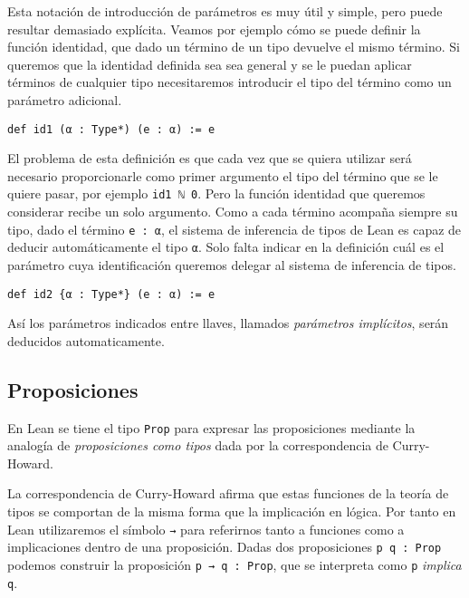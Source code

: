 Esta notación de introducción de parámetros es muy útil y simple, pero puede
resultar demasiado explícita. Veamos por ejemplo cómo se puede definir la
función identidad, que dado un término de un tipo devuelve el mismo término.
Si queremos que la identidad definida sea sea general y se le puedan aplicar términos
de cualquier tipo necesitaremos introducir el tipo del término como un parámetro
adicional.

\begin{lstlisting}
def id1 (α : Type*) (e : α) := e
\end{lstlisting}

El problema de esta definición es que cada vez que se quiera utilizar será
necesario proporcionarle como primer argumento el tipo del término que se le
quiere pasar, por ejemplo \lstinline{id1 ℕ 0}.
Pero la función identidad que queremos considerar recibe un solo argumento.
Como a cada término acompaña siempre su tipo, dado el término \lstinline{e : α},
el sistema de inferencia de tipos de Lean es capaz de deducir automáticamente el
tipo \lstinline{α}. Solo falta indicar en la definición cuál es el parámetro
cuya identificación queremos delegar al sistema de inferencia de tipos.

\begin{lstlisting}
def id2 {α : Type*} (e : α) := e
\end{lstlisting}

Así los parámetros indicados entre llaves, llamados \textit{parámetros
	implícitos}, serán deducidos automaticamente.


\subsection{Proposiciones}

En Lean se tiene el tipo \lstinline{Prop} para expresar las proposiciones
mediante la analogía de \textit{proposiciones como tipos} dada por la
correspondencia de Curry-Howard.

La correspondencia de Curry-Howard afirma que estas funciones de la
teoría de tipos se comportan de la misma forma que la implicación en lógica. Por
tanto en Lean utilizaremos el símbolo \lstinline{→} para referirnos tanto a
funciones como a implicaciones dentro de una proposición. Dadas dos
proposiciones \lstinline{p q : Prop} podemos construir la proposición
\lstinline{p → q : Prop}, que se interpreta como \lstinline{p} \textit{implica}
\lstinline{q}.

